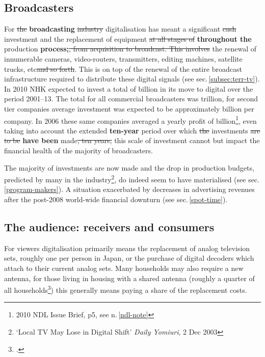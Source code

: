 \documentclass[11pt, oneside, a4paper, headsepline]{scrartcl}
\newcommand{\ty}{\textyen}
\begin{document}
\subsection{Broadcasters} 
For \st{the} \textbf{broadcasting} \st{ industry } digitalisation has meant a significant \st{cash} investment and the replacement of equipment \st{at all stages of} \textbf{throughout the} production \textbf{process;}\st{, from acquisition to broadcast. This involves} the renewal of innumerable cameras, video-routers, transmitters, editing machines, satellite trucks, etc\st{and so forth}. This is on top of the renewal of the entire broadcast infrastructure required to distribute these digital signals (see sec.\,\ref{subsec:terr-tv}). In 2010 NHK expected to invest a total of \ty400 billion in its move to digital over the period 2001--13. The total for all commercial broadcasters was \ty1.04 trillion, for second tier companies average investment was expected to be approximately \ty5.4 billion per company. In 2006 these same companies averaged a yearly profit of \ty 0.35 billion\footnote{2010 NDL Issue Brief, p5, see n.\,\ref{ndl-note}}, even taking into account the extended \textbf{ten-year} period over which \st{ the }investments \st{are to be }  \textbf{have been} made\st{, ten years, } this scale of investment cannot but impact the financial health of the majority of broadcasters.

The majority of investments are now made and the drop in production budgets, predicted by many in the industry\footnote{`Local TV May Lose in Digital Shift' \emph{Daily Yomiuri}, 2 Dec 2003}, do indeed seem to have materialised (see sec.\,\ref{program-makers}). A situation  exacerbated by decreases in advertising revenues after the post-2008 world-wide financial downturn (see sec.\,\ref{spot-time}).

\subsection{The audience: receivers and consumers}
\label{digi-viewers}
For viewers digitalisation primarily means the replacement of analog television sets, roughly one per person in Japan, or the purchase of digital decoders which attach to their current analog sets. Many households may also require a new antenna, for those living in housing with a shared antenna (roughly a quarter of all households\footcite{Kimura:2007}) this generally means paying a share of the replacement costs. 
\end{document}
